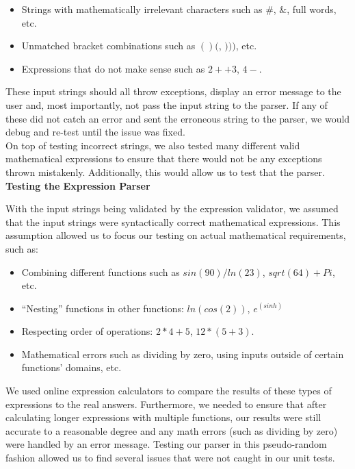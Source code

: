 \documentclass[a4paper, 12pt]{article}
\begin{document}
\begin{itemize}[noitemsep,topsep=0pt,parsep=0pt,partopsep=0pt]
\item Strings with mathematically irrelevant characters such as $\#$, $\&$, full words, etc.

\item Unmatched bracket combinations such as $()($, $)))$, etc.

\item Expressions that do not make sense such as $2++3$, $4-$.
\end{itemize}

\vspace{5mm}

These input strings should all throw exceptions, display an error message to the user and, most importantly, not pass the input string to the parser. If any of these did not catch an error and sent the erroneous string to the parser, we would debug and re-test until the issue was fixed.
\\

On top of testing incorrect strings, we also tested many different valid mathematical expressions to ensure that there would not be any exceptions thrown mistakenly. Additionally, this would allow us to test that the parser.
\\

\textbf{Testing the Expression Parser}

With the input strings being validated by the expression validator, we assumed that the input strings were syntactically correct mathematical expressions. This assumption allowed us to focus our testing on actual mathematical requirements, such as:
\\

\begin{itemize}[noitemsep,topsep=0pt,parsep=0pt,partopsep=0pt]
\item Combining different functions such as $sin(90)/ln(23)$, $sqrt(64)+Pi$, etc.
\item “Nesting” functions in other functions: $ln(cos(2))$, $e^(sinh)$
\item Respecting order of operations: $2*4+5$, $12 * ( 5 + 3 )$.
\item Mathematical errors such as dividing by zero, using inputs outside of certain functions’ domains, etc. 
\end{itemize}

\vspace{5mm}

We used online expression calculators to compare the results of these types of expressions to the real answers.  Furthermore, we needed to ensure that after calculating longer expressions with multiple functions, our results were still accurate to a reasonable degree and any math errors (such as dividing by zero) were handled by an error message. Testing our parser in this pseudo-random fashion allowed us to find several issues that were not caught in our unit tests.
\\
\end{document}
